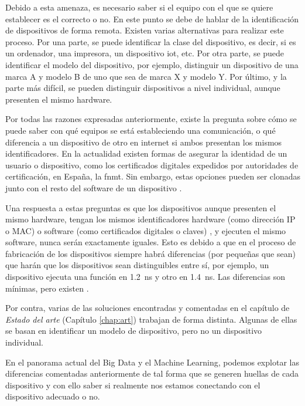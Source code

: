 Debido a esta amenaza, es necesario saber si el equipo con el que se quiere establecer es el correcto o no. En este punto se debe de hablar de la identificación de dispositivos de forma remota. Existen varias alternativas para realizar este proceso. Por una parte, se puede identificar la clase del dispositivo, es decir, si es un ordenador, una impresora, un dispositivo \acrfull{iot}, etc. Por otra parte, se puede identificar el modelo del dispositivo, por ejemplo, distinguir un dispositivo de una marca A y modelo B de uno que sea de marca X y modelo Y. Por último, y la parte más difícil, se pueden distinguir dispositivos a nivel individual, aunque presenten el mismo hardware.

Por todas las razones expresadas anteriormente, existe la pregunta sobre cómo se puede saber con qué equipos se está estableciendo una comunicación, o qué diferencia a un dispositivo de otro en internet si ambos presentan los mismos identificadores. En la actualidad existen formas de asegurar la identidad de un usuario o dispositivo, como los certificados digitales expedidos por autoridades de certificación, en España, la \acrfull{fnmt}. Sin embargo, estas opciones pueden ser clonadas junto con el resto del software de un dispositivo \cite{yousefnezhad2020security}.

Una respuesta a estas preguntas es que los dispositivos aunque presenten el mismo hardware, tengan los mismos identificadores hardware (como dirección IP o MAC) o software (como certificados digitales o claves) , y ejecuten el mismo software, nunca serán exactamente iguales. Esto es debido a que en el proceso de fabricación de los dispositivos siempre habrá diferencias (por pequeñas que sean) que harán que los dispositivos sean distinguibles entre sí, por ejemplo, un dispositivo ejecuta una función en \SI{1.2}{\nano\second} y otro en \SI{1.4}{\nano\second}. Las diferencias son mínimas, pero existen \cite{al2018survey}.

Por contra, varias de las soluciones encontradas y comentadas en el capítulo de \textit{Estado del arte} (Capítulo \ref{chap:art}) trabajan de forma distinta. Algunas de ellas se basan en identificar un modelo de dispositivo, pero no un dispositivo individual.

En el panorama actual del Big Data y el Machine Learning, podemos explotar las diferencias comentadas anteriormente de tal forma que se generen huellas de cada dispositivo y con ello saber si realmente nos estamos conectando con el dispositivo adecuado o no.

